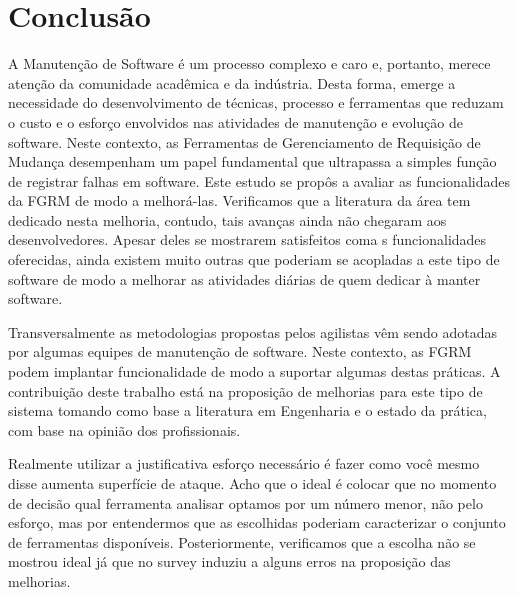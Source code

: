 \chapter{Conclusão}
\label{ch:conclusao_trab_futuros}

A Manutenção de Software é um processo complexo e caro e, portanto,  merece
atenção da comunidade acadêmica e da indústria. Desta forma, emerge a
necessidade do desenvolvimento de técnicas, processo e ferramentas que reduzam o
custo e o esforço envolvidos nas atividades de manutenção e evolução de
software. Neste contexto, as Ferramentas de Gerenciamento de Requisição de
Mudança desempenham um papel fundamental que ultrapassa a simples função de
registrar falhas em software. Este estudo se propôs a avaliar as funcionalidades
da FGRM de modo a melhorá-las. Verificamos que a literatura da área tem dedicado
nesta melhoria, contudo, tais avanças ainda não chegaram aos desenvolvedores.
Apesar deles se mostrarem satisfeitos coma s funcionalidades oferecidas, ainda
existem muito outras que poderiam se acopladas a este tipo de software de modo a
melhorar as atividades diárias de quem dedicar à manter software.

Transversalmente as metodologias propostas pelos agilistas vêm sendo adotadas
por algumas equipes de manutenção de software. Neste contexto, as FGRM podem
implantar funcionalidade de modo a suportar algumas destas práticas. A
contribuição deste trabalho está na proposição de melhorias para este tipo de
sistema tomando como base a literatura em Engenharia e o estado da prática, com
base na opinião dos profissionais.


Realmente utilizar a justificativa esforço necessário é fazer como você mesmo
disse aumenta superfície de ataque. Acho que o ideal é colocar que no momento
de decisão qual ferramenta analisar optamos por um número menor, não pelo
esforço, mas por entendermos que as escolhidas poderiam caracterizar o conjunto
de ferramentas disponíveis. Posteriormente, verificamos que a escolha não se
mostrou ideal já que no survey induziu a alguns erros na proposição das
melhorias.
